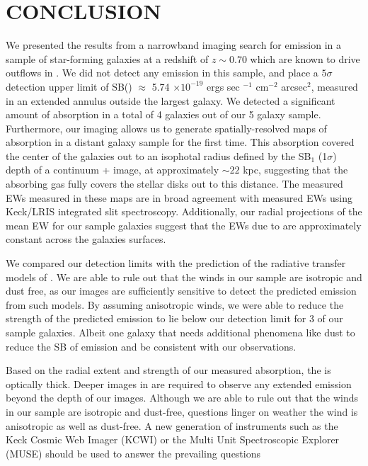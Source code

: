 \documentclass[twocolumn]{aastex61}
\begin{document}
\section{CONCLUSION}\label{sec:conclusion}
We presented the results from a narrowband imaging search for  emission in a sample of star-forming galaxies at a redshift of $z \sim 0.70$ which are known to drive outflows in  . We did not detect any  emission in this sample, and place a $5\sigma$ detection upper limit of SB() $\approx$ 5.74 $\times 10^{-19}$ ergs sec $^{-1}$ cm$^{-2}$ arcsec$^2$, measured in an extended annulus outside the largest galaxy. We detected a significant amount of  absorption in a total of 4 galaxies out of our 5 galaxy sample. Furthermore, our imaging allows us to generate spatially-resolved maps of  absorption in a distant galaxy sample for the first time. This absorption covered the center of the galaxies out to an isophotal radius defined by the SB$_1$ (1$\sigma$) depth of a continuum +  image, at approximately $\sim 22$ kpc, suggesting that the absorbing gas fully covers the stellar disks out to this distance. The measured EWs measured in these maps are in broad agreement with measured EWs using Keck/LRIS integrated slit spectroscopy. Additionally, our radial projections of the mean EW for our sample galaxies suggest that the EWs due to  are approximately constant across the galaxies surfaces. 

We compared our detection limits with the prediction of the radiative transfer models of \cite{Prochaska_2011}. We are able to rule out that the winds in our sample are isotropic and dust free, as our images are sufficiently sensitive to detect the predicted emission from such models. By assuming anisotropic winds, we were able to reduce the strength of the predicted emission to lie below our detection limit for 3 of our sample galaxies. Albeit one galaxy that needs additional phenomena like dust to reduce the SB of emission and be consistent with our observations.

Based on the radial extent and strength of our measured  absorption, the  is optically thick. Deeper images in  are required to observe any extended emission beyond the depth of our images. Although we are able to rule out that the winds in our sample are isotropic and dust-free, questions linger on weather the wind is anisotropic as well as dust-free. A new generation of instruments such as the Keck Cosmic Web Imager (KCWI) or the Multi Unit Spectroscopic Explorer (MUSE) should be used to answer the prevailing questions
\end{document}
